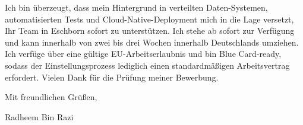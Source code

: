 \documentclass[11pt,a4paper]{coverletter}
\begin{document}
Ich bin überzeugt, dass mein Hintergrund in verteilten Daten-Systemen, automatisierten Tests und Cloud-Native-Deployment mich in die Lage versetzt, Ihr Team in Eschborn sofort zu unterstützen. Ich stehe ab sofort zur Verfügung und kann innerhalb von zwei bis drei Wochen innerhalb Deutschlands umziehen. Ich verfüge über eine gültige EU-Arbeitserlaubnis und bin Blue Card-ready, sodass der Einstellungsprozess lediglich einen standardmäßigen Arbeitsvertrag erfordert. Vielen Dank für die Prüfung meiner Bewerbung.

\closing{Mit freundlichen Grüßen,}{Radheem Bin Razi}
\end{document}
